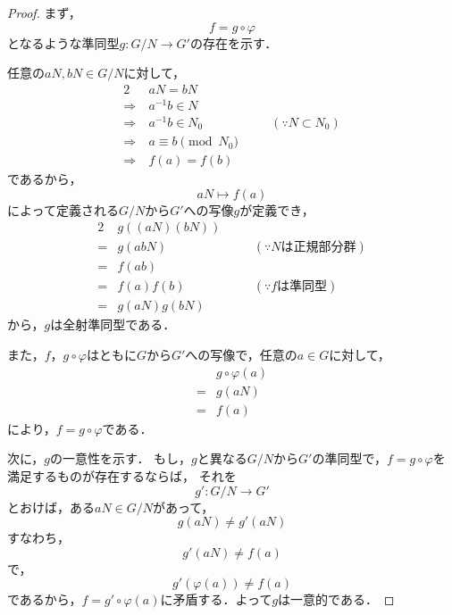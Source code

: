 \documentclass[dvipdfmx,uplatex,11pt]{jsarticle}
\theoremstyle{mytheorem}
\begin{document}
        \begin{leftbar}
            \begin{proof}
                まず，
                \[
                    f = g \circ \varphi
                \]
                となるような準同型$g \colon G / N \longrightarrow G'$の存在を示す．

                任意の$ a N , b N \in G /N$に対して，
                \begin{alignat*}{2}
                    & aN = bN & &\\
                    \Longrightarrow~ & a^{-1} b \in N & &\\
                    \Longrightarrow ~& a^{-1} b \in N_0 &\quad &(\because N \subset N_0) \\
                    \Longrightarrow ~& a \equiv b \pmod{N_0} & \quad &\\
                    \Longrightarrow ~& f(a)=f(b) & &
                \end{alignat*}
                であるから，
                \[
                    aN \longmapsto f(a)
                \]
                によって定義される$G / N$から$G'$への写像$g$が定義でき，
                \begin{alignat*}{2}
                    & g((aN)(bN)) & \quad & \\
                    =& g(abN) &\quad&  (\because \text{$N$は正規部分群}) \\
                    =& f(ab) & & \\
                    =& f(a)f(b) & & (\because \text{$f$は準同型}) \\
                    =& g(aN)g(bN) & &
                \end{alignat*}
                から，$g$は全射準同型である．

                また，$f$，$g \circ \varphi$はともに$G$から$G'$への写像で，任意の$a \in G$に対して，
                \begin{align*}
                    &g \circ \varphi (a) \\
                    =&g(aN) \\
                    =&f(a)
                \end{align*}
                により，$f = g \circ \varphi$である．

                次に，$g$の一意性を示す．
                もし，$g$と異なる$G /N$から$G'$の準同型で，$f = g \circ \varphi$を満足するものが存在するならば，
                それを
                \[
                    g' \colon G / N \longrightarrow G'
                \]
                とおけば，ある$a N \in G/N$があって，
                \[
                    g(aN) \ne g'(aN)
                \]
                すなわち，
                \[
                    g'(aN) \ne f(a)
                \]
                で，
                \[
                    g'(\varphi(a)) \ne f(a)
                \]
                であるから，$f = g' \circ \varphi (a)$に矛盾する．よって$g$は一意的である．
            \end{proof}
        \end{leftbar}
\end{document}
